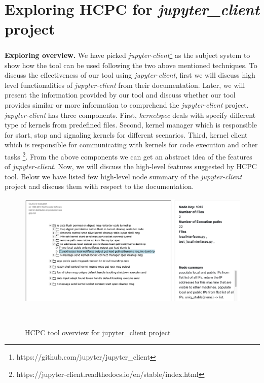\section{Exploring HCPC for \emph{jupyter\_client} project} 
\label{hla3:case_study}
\textbf{Exploring overview. } We have picked \emph{jupyter-client}\footnote{https://github.com/jupyter/jupyter\_client} as the subject system to show how the tool can be used following the two above mentioned techniques. To discuss the effectiveness of our tool using \emph{jupyter-client}, first we will discuss high level functionalities of \emph{jupyter-client} from their documentation. Later, we will present the information provided by our tool and discuss whether our tool provides similar or more information to comprehend the \emph{jupyter-client} project. \emph{jupyter-client} has three components. First, \emph{kernelspec} deals with specify different type of kernels from predefined files. Second, kernel manager which is responsible for start, stop and signaling kernels for different scenarios. Third, kernel client which is responsible for communicating with kernels for code execution and other tasks \footnote{https://jupyter-client.readthedocs.io/en/stable/index.html}. From the above components we can get an abstract idea of the features of \emph{jupyter-client}. Now, we will discuss the high-level features suggested by HCPC tool. Below we have listed few high-level node summary of the \emph{jupyter-client} project and discuss them with respect to the documentation.

\begin{figure}[h]
  \centering
  \includegraphics[width=\columnwidth]{figures/hla3/hla3_jupyter_overview.png}
  \caption{HCPC tool overview for jupyter\_client project }~\label{fig:tool_overview_jupyter_client}
\end{figure}

